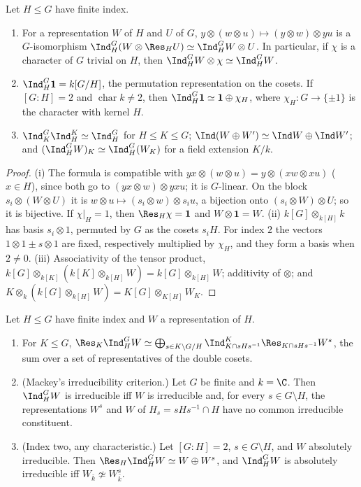 \begin{proposition}\label{prop:reps:projection-formula}
Let $H\le G$ have finite index.
\begin{enumerate}[label=(\roman*)]
\item For a representation $W$ of $H$ and $U$ of $G$, $y\otimes(w\otimes u)\mapsto(y\otimes w)\otimes yu$ is a $G$-isomorphism
$\Ind_H^G(W\otimes\Res_HU)\simeq\Ind_H^GW\otimes U$. In particular, if $\chi$ is a character of $G$ trivial on $H$, then $\Ind_H^GW\otimes\chi\simeq\Ind_H^GW$.
\item $\Ind_H^G\mathbf1=k[G/H]$, the permutation representation on the cosets. If $[G:H]=2$ and $\operatorname{char}k\ne2$, then $\Ind_H^G\mathbf1\simeq\mathbf1\oplus\chi_H$,
where $\chi_H\colon G\to\{\pm1\}$ is the character with kernel $H$.
\item $\Ind_K^G\Ind_H^K\simeq\Ind_H^G$ for $H\le K\le G$; $\Ind(W\oplus W')\simeq\Ind W\oplus\Ind W'$; and $(\Ind_H^GW)_K\simeq\Ind_H^G(W_K)$ for a field extension
$K/k$.
\end{enumerate}
\end{proposition}

\begin{proof}
(i) The formula is compatible with $yx\otimes(w\otimes u)=y\otimes(xw\otimes xu)$ ($x\in H$), since both go to $(yx\otimes w)\otimes yxu$; it is $G$-linear.
On the block $s_i\otimes(W\otimes U)$ it is $w\otimes u\mapsto(s_i\otimes w)\otimes s_iu$, a bijection onto $(s_i\otimes W)\otimes U$; so it is bijective. If
$\chi|_H=1$, then $\Res_H\chi=\mathbf1$ and $W\otimes\mathbf1=W$.
(ii) $k[G]\otimes_{k[H]}k$ has basis $s_i\otimes1$, permuted by $G$ as the cosets $s_iH$. For index $2$ the vectors $1\otimes1\pm s\otimes1$ are fixed,
respectively multiplied by $\chi_H$, and they form a basis when $2\ne0$.
(iii) Associativity of the tensor product, $k[G]\otimes_{k[K]}(k[K]\otimes_{k[H]}W)=k[G]\otimes_{k[H]}W$; additivity of $\otimes$; and $K\otimes_k(k[G]\otimes_{k[H]}W)=
K[G]\otimes_{K[H]}W_K$.
\end{proof}

\begin{theorem}[Mackey]\label{thm:reps:mackey}
Let $H\le G$ have finite index and $W$ a representation of $H$.
\begin{enumerate}[label=(\alph*)]
\item For $K\le G$, $\Res_K\Ind_H^GW\simeq\bigoplus_{s\in K\backslash G/H}\Ind^K_{K\cap sHs^{-1}}\Res_{K\cap sHs^{-1}}W^s$, the sum over a set of representatives of the
double cosets.
\item (Mackey's irreducibility criterion.) Let $G$ be finite and $k=\C$. Then $\Ind_H^GW$ is irreducible iff $W$ is
irreducible and, for every $s\in G\setminus H$, the representations $W^s$ and $W$ of $H_s=sHs^{-1}\cap H$ have no common irreducible
constituent.
\item (Index two, any characteristic.) Let $[G:H]=2$, $s\in G\setminus H$, and $W$ absolutely irreducible. Then $\Res_H\Ind_H^GW\simeq W\oplus W^s$, and
$\Ind_H^GW$ is absolutely irreducible iff $W_{\bar k}\not\simeq W^s_{\bar k}$.
\end{enumerate}
\end{theorem}

